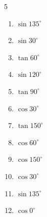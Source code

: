\begin{multicols}{5}
\begin{enumerate}

  \item $\displaystyle \sin{135^\circ}$


  \item $\displaystyle \sin{30^\circ}$


  \item $\displaystyle \tan{60^\circ}$


\columnbreak %

  \item $\displaystyle \sin{120^\circ}$


  \item $\displaystyle \tan{90^\circ}$

        \phantom{$\displaystyle なし$}

  \item $\displaystyle \cos{30^\circ}$


  \item $\displaystyle \tan{150^\circ}$


  \item $\displaystyle \cos{60^\circ}$


  \item $\displaystyle \cos{150^\circ}$


  \item $\displaystyle \cos{30^\circ}$


  \item $\displaystyle \sin{135^\circ}$


  \item $\displaystyle \cos{0^\circ}$


\end{enumerate}
\end{multicols}
